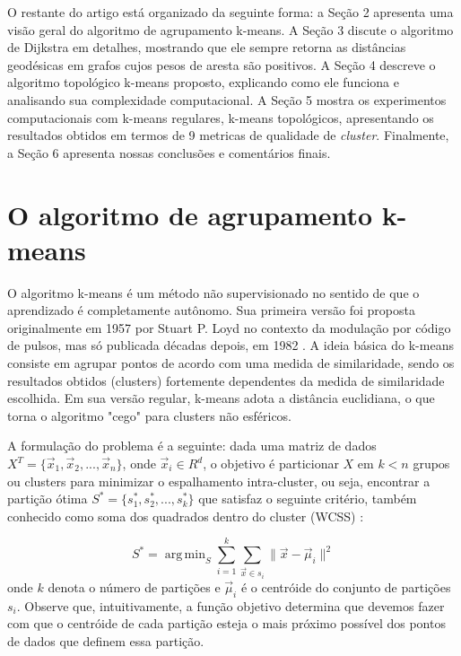 \documentclass[sn-mathphys,Numbered]{sn-jnl}%
\theoremstyle{thmstyleone}%
\theoremstyle{thmstyletwo}%
\theoremstyle{thmstylethree}%
\DeclareMathOperator*{\argmin}{arg\,min}
\begin{document}
O restante do artigo está organizado da seguinte forma: a Seção 2 apresenta uma visão geral do algoritmo de agrupamento k-means. A Seção 3 discute o algoritmo de Dijkstra em detalhes, mostrando que ele sempre retorna as distâncias geodésicas em grafos cujos pesos de aresta são positivos. A Seção 4 descreve o algoritmo topológico k-means proposto, explicando como ele funciona e analisando sua complexidade computacional. A Seção 5 mostra os experimentos computacionais com k-means regulares, k-means topológicos, apresentando os resultados obtidos em termos de 9 metricas de qualidade de \textit{cluster}. Finalmente, a Seção 6 apresenta nossas conclusões e comentários finais.

\section{O algoritmo de agrupamento k-means}

O algoritmo k-means é um método não supervisionado no sentido de que o aprendizado é completamente autônomo. Sua primeira versão foi proposta originalmente em 1957 por Stuart P. Loyd no contexto da modulação por código de pulsos, mas só publicada décadas depois, em 1982 \cite{Loyd}. A ideia básica do k-means consiste em agrupar pontos de acordo com uma medida de similaridade, sendo os resultados obtidos (clusters) fortemente dependentes da medida de similaridade escolhida. Em sua versão regular, k-means adota a distância euclidiana, o que torna o algoritmo "cego" para clusters não esféricos.

A formulação do problema é a seguinte: dada uma matriz de dados $X^T = \{ \vec{x}_1, \vec{x}_2, ..., \vec{x}_n \}$, onde $\vec{x}_i \in R^d$, o objetivo é particionar $X$ em $k < n$ grupos ou clusters para minimizar o espalhamento intra-cluster, ou seja, encontrar a partição ótima $S^{*} = \{ s_1^{*}, s_2^{*}, ..., s_k^{*} \}$ que satisfaz o seguinte critério, também conhecido como soma dos quadrados dentro do cluster (WCSS) \cite{kmeans_survey}:

\begin{equation}
	S^{*} = \argmin_{S} \sum_{i=1}^{k} \sum_{\vec{x} \in s_i} \lVert \vec{x} - \vec{\mu}_i  \rVert^2
\end{equation} onde $k$ denota o número de partições e $\vec{\mu}_i$ é o centróide do conjunto de partições $s_i$. Observe que, intuitivamente, a função objetivo determina que devemos fazer com que o centróide de cada partição esteja o mais próximo possível dos pontos de dados que definem essa partição.
\end{document}
